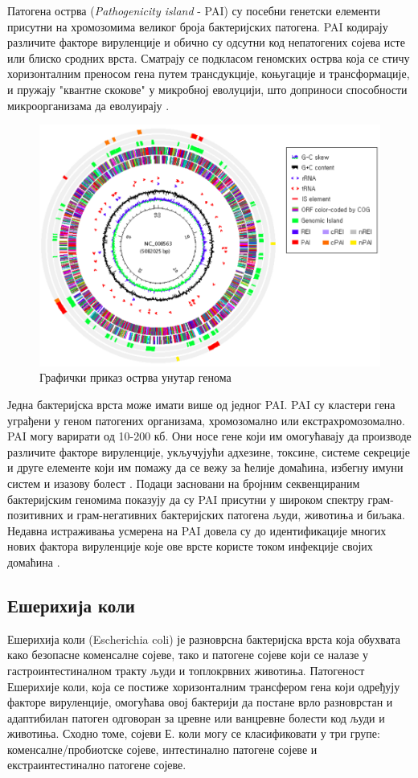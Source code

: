 \documentclass[12pt]{article}
\begin{document}
Патогена острва (\textit{Pathogenicity island} - PAI) су посебни генетски елементи присутни на хромозомима великог броја бактеријских патогена. PAI кодирају различите факторе вируленције и обично су одсутни код непатогених сојева исте или блиско сродних врста. Сматрају се подкласом геномских острва која се стичу хоризонталним преносом гена путем трансдукције, коњугације и трансформације, и пружају "квантне скокове" у микробној еволуцији, што доприноси способности микроорганизама да еволуирају \cite{Gal-Mor2006-dv}. 

\begin{figure}[h]
    \centering
    \includegraphics[width=0.6\linewidth]{images/paidb.png}
    \caption{Графички приказ острва унутар генома}
    \label{fig:islands}
\end{figure}

Једна бактеријска врста може имати више од једног PAI. PAI су кластери гена уграђени у геном патогених организама, хромозомално или екстрахромозомално. PAI могу варирати од 10-200 кб. Они носе гене који им омогућавају да производе различите факторе вируленције, укључујући адхезине, токсине, системе секреције и друге елементе који им помажу да се вежу за ћелије домаћина, избегну имуни систем и изазову болест \cite{Schmidt2004-xj}. Подаци засновани на бројним секвенцираним бактеријским геномима показују да су PAI присутни у широком спектру грам-позитивних и грам-негативних бактеријских патогена људи, животиња и биљака. Недавна истраживања усмерена на PAI довела су до идентификације многих нових фактора вируленције које ове врсте користе током инфекције својих домаћина \cite{Gal-Mor2006-dv}.

\subsection{Ешерихија коли}

Ешерихија коли (Escherichia coli) је разноврсна бактеријска врста која обухвата како безопасне коменсалне сојеве, тако и патогене сојеве који се налазе у гастроинтестиналном тракту људи и топлокрвних животиња. Патогеност Ешерихије коли, која се постиже хоризонталним трансфером гена који одређују факторе вируленције, омогућава овој бактерији да постане врло разноврстан и адаптибилан патоген одговоран за цревне или ванцревне болести код људи и животиња. Сходно томе, сојеви Е. коли могу се класификовати у три групе: коменсалне/пробиотске сојеве, интестинално патогене сојеве и екстраинтестинално патогене сојеве.
\end{document}
